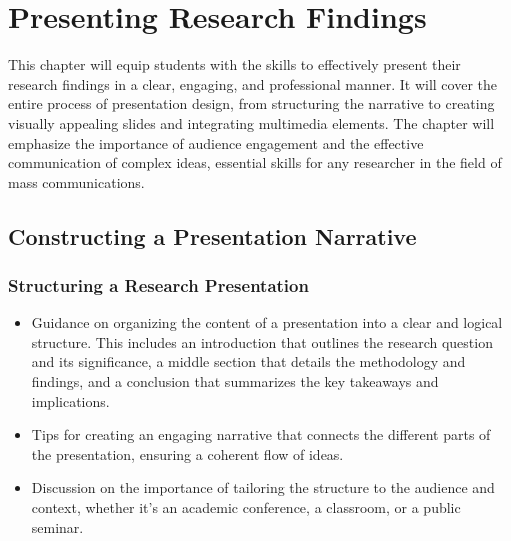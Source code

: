 \documentclass[
]{book}
\begin{document}
\hypertarget{presenting-research-findings}{%
\chapter*{Presenting Research Findings}\label{presenting-research-findings}}

This chapter will equip students with the skills to effectively present their research findings in a clear, engaging, and professional manner. It will cover the entire process of presentation design, from structuring the narrative to creating visually appealing slides and integrating multimedia elements. The chapter will emphasize the importance of audience engagement and the effective communication of complex ideas, essential skills for any researcher in the field of mass communications.

\hypertarget{constructing-a-presentation-narrative}{%
\section*{Constructing a Presentation Narrative}\label{constructing-a-presentation-narrative}}

\hypertarget{structuring-a-research-presentation}{%
\subsection*{Structuring a Research Presentation}\label{structuring-a-research-presentation}}

\begin{itemize}
\item
  Guidance on organizing the content of a presentation into a clear and logical structure. This includes an introduction that outlines the research question and its significance, a middle section that details the methodology and findings, and a conclusion that summarizes the key takeaways and implications.
\item
  Tips for creating an engaging narrative that connects the different parts of the presentation, ensuring a coherent flow of ideas.
\item
  Discussion on the importance of tailoring the structure to the audience and context, whether it's an academic conference, a classroom, or a public seminar.
\end{itemize}
\end{document}
